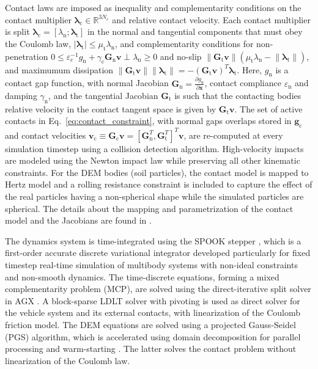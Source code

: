\documentclass[10pt]{article}
\newcommand\norm[1]{\lVert#1\rVert}
\begin{document}
Contact laws are imposed as inequality and complementarity conditions on the contact multiplier $\bm{\lambda}_{\mathrm{c}}\in\mathbb{R}^{3N_\mathrm{c}}$
and relative contact velocity.
Each contact multiplier 
is split $\bm{\lambda}_{\mathrm{c}} = [\lambda_{\mathrm{n}};\bm{\lambda}_{\mathrm{t}}]$
in the normal and tangential components that must obey the Coulomb law, 
$|\bm{\lambda}_{\mathrm{t}}| \leq \mu_{\mathrm{t}} \lambda_{\mathrm{n}}$, and complementarity conditions for non-penetration $0\leq \varepsilon^{-1}_\mathrm{c}g_\mathrm{n} + \gamma_\mathrm{c} \bm{G}_\mathrm{n}\bm{v} \perp \lambda_\mathrm{n}\geq 0$ and no-slip $\norm{\bm{G}_\mathrm{t} \bm{v}}(\mu_{\mathrm{t}} \lambda_{\mathrm{n}} - \norm{\bm{\lambda}_{\mathrm{t}}}) $, and maximumum dissipation $\norm{\bm{G}_\mathrm{t} \bm{v}}\norm{\bm{\lambda}_{\mathrm{t}}} = - (\bm{G}_\mathrm{t} \bm{v})^T\bm{\lambda}_{\mathrm{t}}$. Here, $g_\mathrm{n}$ is a contact gap function, with normal Jacobian $\bm{G}_\mathrm{n}=\frac{\partial g_\mathrm{n}}{\partial \bm{x}}$, contact compliance $\varepsilon_\mathrm{n}$ and damping $\gamma_\mathrm{n}$, and the tangential Jacobian $\bm{G}_\mathrm{t}$ is such that the contacting bodies relative velocity in the contact tangent space is given by $\bm{G}_\mathrm{t} \bm{v}$. 
The set of active contacts in Eq.~\eqref{eq:contact_constraint}, with normal gaps overlaps stored in $\bm{g}_\mathrm{c}$ and contact velocities $\bm{v}_\mathrm{c} \equiv \bm{G}_\mathrm{c} \bm{v} = [\bm{G}^T_\mathrm{n},\bm{G}^T_\mathrm{t}]^T \bm{v}$, are re-computed at every simulation timestep using a collision detection algorithm.
High-velocity impacts are modeled using the Newton impact law while preserving all other kinematic constraints. 
For the DEM bodies (soil particles), the contact model is mapped to Hertz model and a rolling resistance constraint is included to capture the effect of the real particles having a non-spherical shape while the simulated particles are spherical. The details about the mapping and parametrization of the contact model and the Jacobians are found in \cite{servin:2014:esn,wiberg:2021:dem,Servin2021}.

The dynamics system is time-integrated using the SPOOK stepper \cite{Lacoursiere2007}, which is a first-order accurate discrete variational integrator developed particularly for fixed timestep real-time simulation of multibody systems with non-ideal constraints and non-smooth dynamics. The time-discrete equations, forming a mixed complementarity problem (MCP), are solved using the direct-iterative split solver in AGX \cite{AGX20}. 
A block-sparse LDLT solver with pivoting \cite{lacoursiere2010} is used as direct solver
for the vehicle system and its external contacts, with linearization of the Coulomb friction model. The DEM equations are solved using a projected Gauss-Seidel (PGS) algorithm, which is accelerated using domain decomposition for parallel processing and warm-starting \cite{wang:2016:wsp}. The latter solves the contact problem without linearization of the Coulomb law.
\end{document}
